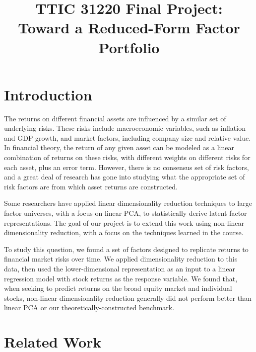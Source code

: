 \documentclass[a4paper]{article}
\title{TTIC 31220 Final Project: \\ Toward a Reduced-Form Factor Portfolio}
\begin{document}
  \maketitle

  \section{Introduction}

    The returns on different financial assets are influenced by a similar set of underlying risks. These risks include macroeconomic variables, such as inflation and GDP growth, and market factors, including company size and relative value. In financial theory, the return of any given asset can be modeled as a linear combination of returns on these risks, with different weights on different risks for each asset, plus an error term. However, there is no consensus set of risk factors, and a great deal of research has gone into studying what the appropriate set of risk factors are from which asset returns are constructed.
    \par Some researchers have applied linear dimensionality reduction techniques to large factor universes, with a focus on linear PCA, to statistically derive latent factor representations. The goal of our project is to extend this work using non-linear dimensionality reduction, with a focus on the techniques learned in the course. 
    \par To study this question, we found a set of factors designed to replicate returns to financial market risks over time. We applied dimensionality reduction to this data, then used the lower-dimensional representation as an input to a linear regression model with stock returns as the response variable. We found that, when seeking to predict returns on the broad equity market and individual stocks, non-linear dimensionality reduction generally did not perform better than linear PCA or our theoretically-constructed benchmark.

  
  \section{Related Work}
\end{document}
